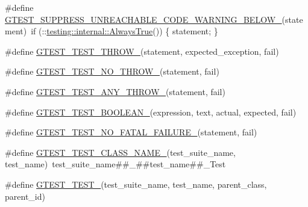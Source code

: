 \begin{DoxyCompactItemize}
\item 
\#define \mbox{\hyperlink{_obj__test_2lib_2googletest-master_2googletest_2include_2gtest_2internal_2gtest-internal_8h_a2e66f7dfc5cb87e0fa0289f653173c69}{G\+T\+E\+S\+T\+\_\+\+S\+U\+P\+P\+R\+E\+S\+S\+\_\+\+U\+N\+R\+E\+A\+C\+H\+A\+B\+L\+E\+\_\+\+C\+O\+D\+E\+\_\+\+W\+A\+R\+N\+I\+N\+G\+\_\+\+B\+E\+L\+O\+W\+\_\+}}(statement)~if (\+::\mbox{\hyperlink{namespacetesting_1_1internal_a922c9da63cd4bf94fc473b9ecac76414}{testing\+::internal\+::\+Always\+True}}()) \{ statement; \}
\item 
\#define \mbox{\hyperlink{_obj__test_2lib_2googletest-master_2googletest_2include_2gtest_2internal_2gtest-internal_8h_a3f71db93eaf30b0cfca9612b9ac32106}{G\+T\+E\+S\+T\+\_\+\+T\+E\+S\+T\+\_\+\+T\+H\+R\+O\+W\+\_\+}}(statement,  expected\+\_\+exception,  fail)
\item 
\#define \mbox{\hyperlink{_obj__test_2lib_2googletest-master_2googletest_2include_2gtest_2internal_2gtest-internal_8h_a9a109d026b5a904646437d7570e13581}{G\+T\+E\+S\+T\+\_\+\+T\+E\+S\+T\+\_\+\+N\+O\+\_\+\+T\+H\+R\+O\+W\+\_\+}}(statement,  fail)
\item 
\#define \mbox{\hyperlink{_obj__test_2lib_2googletest-master_2googletest_2include_2gtest_2internal_2gtest-internal_8h_af48bbd26d54d4afc5e4cef39b1c76ba3}{G\+T\+E\+S\+T\+\_\+\+T\+E\+S\+T\+\_\+\+A\+N\+Y\+\_\+\+T\+H\+R\+O\+W\+\_\+}}(statement,  fail)
\item 
\#define \mbox{\hyperlink{_obj__test_2lib_2googletest-master_2googletest_2include_2gtest_2internal_2gtest-internal_8h_ae8912365e1d00a7a2bd248268c64aa1a}{G\+T\+E\+S\+T\+\_\+\+T\+E\+S\+T\+\_\+\+B\+O\+O\+L\+E\+A\+N\+\_\+}}(expression,  text,  actual,  expected,  fail)
\item 
\#define \mbox{\hyperlink{_obj__test_2lib_2googletest-master_2googletest_2include_2gtest_2internal_2gtest-internal_8h_a1b37a3c446836d33040f3266a6236081}{G\+T\+E\+S\+T\+\_\+\+T\+E\+S\+T\+\_\+\+N\+O\+\_\+\+F\+A\+T\+A\+L\+\_\+\+F\+A\+I\+L\+U\+R\+E\+\_\+}}(statement,  fail)
\item 
\#define \mbox{\hyperlink{_obj__test_2lib_2googletest-master_2googletest_2include_2gtest_2internal_2gtest-internal_8h_ad4bc4ec847a06e7de981e81c9bb116cf}{G\+T\+E\+S\+T\+\_\+\+T\+E\+S\+T\+\_\+\+C\+L\+A\+S\+S\+\_\+\+N\+A\+M\+E\+\_\+}}(test\+\_\+suite\+\_\+name,  test\+\_\+name)~test\+\_\+suite\+\_\+name\#\#\+\_\+\#\#test\+\_\+name\#\#\+\_\+\+Test
\item 
\#define \mbox{\hyperlink{_obj__test_2lib_2googletest-master_2googletest_2include_2gtest_2internal_2gtest-internal_8h_ab43103f7842de04474e362689f782a46}{G\+T\+E\+S\+T\+\_\+\+T\+E\+S\+T\+\_\+}}(test\+\_\+suite\+\_\+name,  test\+\_\+name,  parent\+\_\+class,  parent\+\_\+id)
\end{DoxyCompactItemize}
